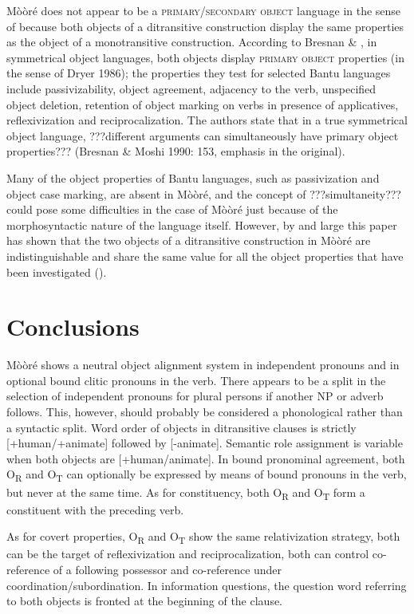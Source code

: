 \documentclass[output=paper]{langsci/langscibook}
\begin{document}
Mòòré does not appear to be a \textsc{primary}/\textsc{secondary object }language in the sense of \citet{Dryer1986} because both objects of a ditransitive construction display the same properties as the object of a monotransitive construction.{ }According to Bresnan \& \citet[147]{Moshi1991}, in symmetrical object languages, both objects display \textsc{primary object} properties (in the sense of Dryer 1986); the properties they test for selected Bantu languages include passivizability, object agreement, adjacency to the verb, unspecified object deletion, retention of object marking on verbs in presence of applicatives, reflexivization and reciprocalization. The authors state that in a true symmetrical object language, ???different arguments can simultaneously have primary object properties??? (Bresnan \& Moshi 1990: 153, emphasis in the original).

Many of the object properties of Bantu languages, such as passivization and object case marking, are absent in Mòòré, and the concept of ???simultaneity??? could pose some difficulties in the case of Mòòré just because of the morphosyntactic nature of the language itself. However, by and large this paper has shown that the two objects of a ditransitive construction in Mòòré are indistinguishable and share the same value for all the object properties that have been investigated ().  

\section{Conclusions}

Mòòré shows a neutral object alignment system in independent pronouns and in optional bound clitic pronouns in the verb. There appears to be a split in the selection of independent pronouns for plural persons if another NP or adverb follows. This, however, should probably be considered a phonological rather than a syntactic split. Word order of objects in ditransitive clauses is strictly [+human/+animate] followed by [-animate]. Semantic role assignment is variable when both objects are [+human/animate]. In bound pronominal agreement, both O\textsubscript{R} and O\textsubscript{T} can optionally be expressed by means of bound pronouns in the verb, but never at the same time. As for constituency, both O\textsubscript{R} and O\textsubscript{T} form a constituent with the preceding verb. 

As for covert properties, O\textsubscript{R} and O\textsubscript{T} show the same relativization strategy, both can be the target of reflexivization and reciprocalization, both can control co-reference of a following possessor and co-reference under coordination/subordination. In information questions, the question word referring to both objects is fronted at the beginning of the clause. 
\end{document}
